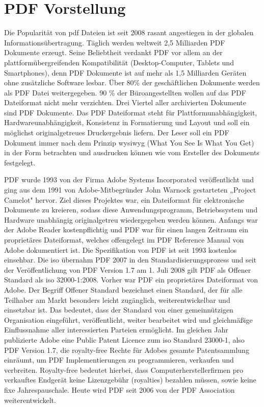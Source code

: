\section{PDF Vorstellung}
Die Popularität von \gls{pdf} Dateien ist seit 2008 rasant angestiegen in der globalen Informationsübertragung. Täglich werden weltweit 2,5 Milliarden PDF Dokumente erzeugt. Seine Beliebtheit verdankt PDF vor allem an der plattformübergreifenden Kompatibilität (Desktop-Computer, Tablets und Smartphones), denn PDF Dokumente ist auf mehr als 1,5 Milliarden Geräten ohne zusätzliche Software lesbar. Über 80\% der geschäftlichen Dokumente werden als PDF Datei weitergegeben. \cite{formilo} 90 \% der Büroangestellten wollen auf das PDF Dateiformat nicht mehr verzichten. Drei Viertel aller archivierten Dokumente sind PDF Dokumente. \cite{kofax} Das PDF Dateiformat steht für Plattformunabhängigkeit, Hardwareunabhängigkeit, Konsistenz in Formatierung und Layout und soll ein möglichst originalgetreues Druckergebnis liefern. Der Leser soll ein PDF Dokument immer nach dem Prinzip \gls{wysiwyg} (What You See Is What You Get) in der Form betrachten und ausdrucken können wie vom Ersteller des Dokuments festgelegt.
\par
PDF wurde 1993 von der Firma Adobe Systems Incorporated veröffentlicht und ging aus dem 1991 von Adobe-Mitbegründer John Warnock gestarteten „Project Camelot" hervor. Ziel dieses Projektes war, ein Dateiformat für elektronische Dokumente zu kreieren, sodass diese Anwendungsprogramm, Betriebssystem und Hardware unabhängig originalgetreu wiedergegeben werden können. Anfangs war der Adobe Reader kostenpflichtig und PDF war für einen langen Zeitraum ein proprietäres Dateiformat, welches offengelegt im PDF Reference Manual von Adobe dokumentiert ist. Die Spezifikation von PDF ist seit 1993 kostenlos einsehbar. \cite{wiki-pdf-engl} Die \gls{iso} übernahm PDF 2007 in den Standardisierungsprozess und seit der Veröffentlichung von PDF Version 1.7 am 1. Juli 2008 gilt PDF als Offener Standard als \gls{iso} 32000-1:2008. \cite{wiki-pdf-de, wiki-pdf-engl} Vorher war PDF ein proprietäres Dateiformat von Adobe. Der Begriff Offener Standard bezeichnet einen Standard, der für alle Teilhaber am Markt besonders leicht zugänglich, weiterentwickelbar und einsetzbar ist. Das bedeutet, dass der Standard von einer gemeinnützigen Organisation eingeführt, veröffentlicht, weiter bearbeitet wird und gleichmäßige Einflussnahme aller interessierten Parteien ermöglicht. \cite{wiki-standard} Im gleichen Jahr publizierte Adobe eine Public Patent Licence zum \gls{iso} Standard 23000-1, also PDF Version 1.7, die royalty-free Rechte für Adobes gesamte Patentsammlung einräumt, um PDF Implementierungen zu programmieren, verkaufen und verbreiten. \cite{wiki-pdf-engl} Royalty-free bedeutet hierbei, dass Computerherstellerfirmen pro verkauftes Endgerät keine Lizenzgebühr (royalties) bezahlen müssen, sowie keine fixe Jahrespauschale. \cite{wiki-roy-free} Heute wird PDF seit 2006 von der PDF Association weiterentwickelt. \cite{wiki-pdf-de}
